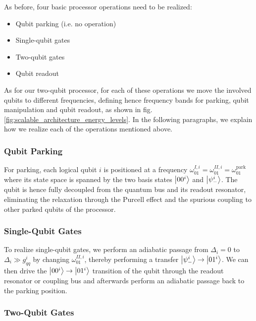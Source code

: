 \smallskip

As before, four basic processor operations need to be realized:

\begin{itemize}
\item Qubit parking (i.e. no operation)
\item Single-qubit gates
\item Two-qubit gates
\item Qubit readout
\end{itemize}

As for our two-qubit processor, for each of these operations we move the involved qubits to different frequencies, defining hence frequency bands for parking, qubit manipulation and qubit readout, as shown in fig. \ref{fig:scalable_architecture_energy_levels}. In the following paragraphs, we explain how we realize each of the operations mentioned above.

\subsubsection{Qubit Parking}

For parking, each logical qubit $i$ is positioned at a frequency $\omega_{01}^{I,i}=\omega_{01}^{II,i}=\omega_{01}^{\mathrm{park}}$ where its state space is spanned by the two basis states $\left| 00^i \right>$ and $\left| \psi_-^i \right>$. The qubit is hence fully decoupled from the quantum bus and its readout resonator, eliminating the relaxation through the Purcell effect and the spurious coupling to other parked qubits of the processor. 

\subsubsection{Single-Qubit Gates}

To realize single-qubit gates, we perform an adiabatic passage from $\Delta_i = 0$ to $\Delta_i \gg g_{qq}^i$ by changing $\omega_{01}^{II,i}$, thereby performing a transfer $\left| \psi_-^i \right>\to\left| 01^i \right>$. We can then drive the $\left| 00^i \right>\to\left| 01^i \right>$ transition of the qubit through the readout resonator or coupling bus and afterwards perform an adiabatic passage back to the parking position.

\subsubsection{Two-Qubit Gates}

